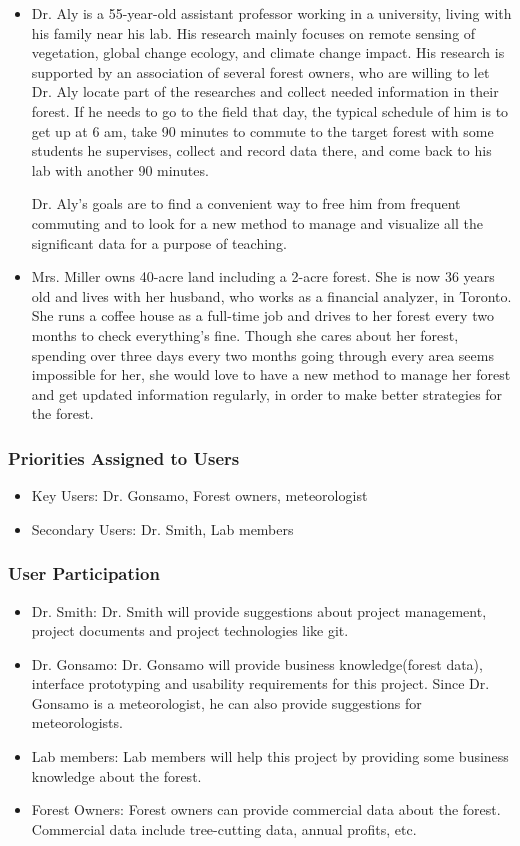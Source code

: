 \documentclass{article}
\begin{document}
\begin{itemize}
    \item Dr. Aly is a 55-year-old assistant professor working in a university, living with his family near his lab. His research mainly focuses on remote sensing of vegetation, global change ecology, and climate change impact. His research is supported by an association of several forest owners, who are willing to let Dr. Aly locate part of the researches and collect needed information in their forest. If he needs to go to the field that day, the typical schedule of him is to get up at 6 am, take 90 minutes to commute to the target forest with some students he supervises, collect and record data there, and come back to his lab with another 90 minutes. 
    
    Dr. Aly's goals are to find a convenient way to free him from frequent commuting and to look for a new method to manage and visualize all the significant data for a purpose of teaching. 
    
    \item Mrs. Miller owns 40-acre land including a 2-acre forest. She is now 36 years old and lives with her husband, who works as a financial analyzer, in Toronto. She runs a coffee house as a full-time job and drives to her forest every two months to check everything's fine. Though she cares about her forest, spending over three days every two months going through every area seems impossible for her, she would love to have a new method to manage her forest and get updated information regularly, in order to make better strategies for the forest. 
\end{itemize}


\subsubsection{Priorities Assigned to Users}
\begin{itemize}
    \item Key Users: Dr. Gonsamo, Forest owners, meteorologist
    \item Secondary Users: Dr. Smith, Lab members
\end{itemize}
\subsubsection{User Participation}
\begin{itemize}
    \item Dr. Smith: Dr. Smith will provide suggestions about project management, project 
    documents and project technologies like git.
    \item Dr. Gonsamo: Dr. Gonsamo will provide business knowledge(forest data), 
    interface prototyping and usability requirements for this project. Since Dr. Gonsamo is 
    a meteorologist, he can also provide suggestions for meteorologists.
    \item Lab members: Lab members will help this project by providing some business knowledge
    about the forest.
    \item Forest Owners: Forest owners can provide commercial data about the forest. Commercial
    data include tree-cutting data, annual profits, etc.
\end{itemize}
\end{document}
